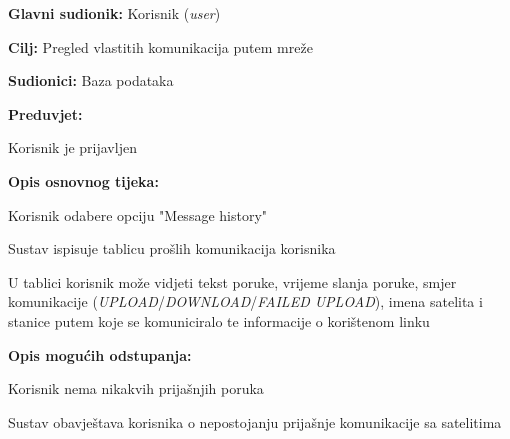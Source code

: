 				\noindent {}
				\begin{packed_item}
					
					\item \textbf{Glavni sudionik: }Korisnik (\textit{user})
					\item  \textbf{Cilj: }Pregled vlastitih komunikacija putem mreže
					\item  \textbf{Sudionici: }Baza podataka
					\item  \textbf{Preduvjet: }
					\begin{packed_enum}\item Korisnik je prijavljen\end{packed_enum}
					\item  \textbf{Opis osnovnog tijeka: }
					
					\item[] \begin{packed_enum}
						
						\item Korisnik odabere opciju "Message history"
						\item Sustav ispisuje tablicu prošlih komunikacija korisnika
						\item U tablici korisnik može vidjeti tekst poruke, vrijeme slanja poruke, smjer komunikacije (\textit{UPLOAD}/\textit{DOWNLOAD}/\textit{FAILED UPLOAD}), imena satelita i stanice putem koje se komuniciralo te informacije o korištenom linku
						
					\end{packed_enum}
					
					\item  \textbf{Opis mogućih odstupanja: }
					
					\item[] \begin{packed_item}
						
						\item[1] Korisnik nema nikakvih prijašnjih poruka
						\item[ ] \begin{packed_enum}
							
							\item[1.1] Sustav obavještava korisnika o nepostojanju prijašnje komunikacije sa satelitima
							
						\end{packed_enum}
					
					\end{packed_item}
				\end{packed_item}
				
